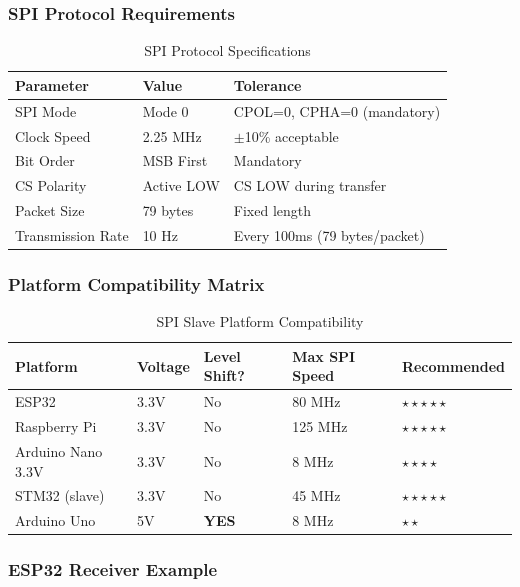 \documentclass[11pt,a4paper]{article}
\begin{document}
\subsubsection{SPI Protocol Requirements}

\begin{table}[H]
\centering
\begin{tabular}{@{}lll@{}}
\toprule
\textbf{Parameter} & \textbf{Value} & \textbf{Tolerance} \\
\midrule
SPI Mode & Mode 0 & CPOL=0, CPHA=0 (mandatory) \\
Clock Speed & 2.25 MHz & $\pm$10\% acceptable \\
Bit Order & MSB First & Mandatory \\
CS Polarity & Active LOW & CS LOW during transfer \\
Packet Size & 79 bytes & Fixed length \\
Transmission Rate & 10 Hz & Every 100ms (79 bytes/packet) \\
\bottomrule
\end{tabular}
\caption{SPI Protocol Specifications}
\end{table}

\subsubsection{Platform Compatibility Matrix}

\begin{table}[H]
\centering
\begin{tabular}{@{}lllll@{}}
\toprule
\textbf{Platform} & \textbf{Voltage} & \textbf{Level Shift?} & \textbf{Max SPI Speed} & \textbf{Recommended} \\
\midrule
ESP32 & 3.3V & No & 80 MHz & $\star\star\star\star\star$ \\
Raspberry Pi & 3.3V & No & 125 MHz & $\star\star\star\star\star$ \\
Arduino Nano 3.3V & 3.3V & No & 8 MHz & $\star\star\star\star$ \\
STM32 (slave) & 3.3V & No & 45 MHz & $\star\star\star\star\star$ \\
Arduino Uno & 5V & \textbf{YES} & 8 MHz & $\star\star$ \\
\bottomrule
\end{tabular}
\caption{SPI Slave Platform Compatibility}
\end{table}

\subsubsection{ESP32 Receiver Example}
\end{document}
